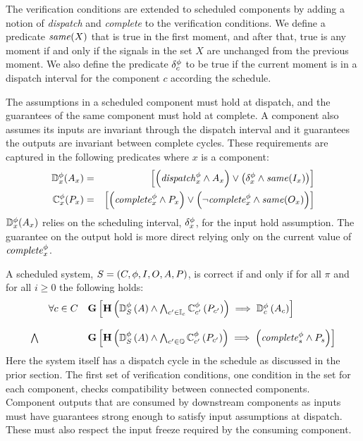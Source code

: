 The verification conditions are extended to scheduled components by adding a notion of \textit{dispatch} and \textit{complete} to the verification conditions.
We define a predicate $\mathit{same}(X)$ that is true in the first moment, and after that, true is any moment if and only if the signals in the set $X$ are unchanged from the previous moment.
We also define the predicate $\delta^\phi_c$ to be true if the current moment is in a dispatch interval for the component $c$ according the schedule.

The assumptions in a scheduled component must hold at dispatch, and the guarantees of the same component must hold at complete.
A component also assumes its inputs are invariant through the dispatch interval and it guarantees the outputs are invariant between complete cycles.
These requirements are captured in the following predicates where $x$ is a component:
\begin{eqnarray*}
  \mathbb{D}^\phi_x(A_x) &=& \left[\left(\mathit{dispatch}^{\phi}_x \wedge A_x\right) \vee \left(\delta^\phi_x \wedge \mathit{same}(I_x)\right)\right] \\
  \mathbb{C}^\phi_x(P_x) &=& \left[\left(\mathit{complete}^{\phi}_x \wedge P_x\right) \vee \left(\neg\mathit{complete}^{\phi}_x \wedge \mathit{same}(O_x)\right)\right] \\
\end{eqnarray*}
$\mathbb{D}^\phi_x(A_x)$ relies on the scheduling interval, $\delta^\phi_x$, for the input hold assumption.
The guarantee on the output hold is more direct relying only on the current value of $\mathit{complete}^{\phi}_x$.

A scheduled system, $S = (C, \phi, I, O, A, P)$, is correct if and only if for all $\pi$ and for all $i \ge 0$ the following holds:
\[
\begin{array}{lll}
        & \forall c \in C &  
            \mathbf{G}\left[\mathbf{H}\left(\mathbb{D}^\phi_S\left(A\right) \wedge 
            \bigwedge_{c^\prime \in \mathbb{I}_c} \mathbb{C}^\phi_{c^\prime}\left(P_{c^\prime}\right)\right) 
            \implies \mathbb{D}^\phi_c\left(A_c\right)\right] \\ \\
 \bigwedge &   & 
            \mathbf{G}\left[\mathbf{H}\left(\mathbb{D}^\phi_S\left(A\right) \wedge 
            \bigwedge_{c^\prime \in \mathbb{O}} \mathbb{C}^\phi_{c^\prime}\left(P_{c^\prime}\right)\right)
            \implies \left(\mathit{complete}^{\phi}_s \wedge P_s\right)\right]
\end{array}
\]
Here the system itself has a dispatch cycle in the schedule as discussed in the prior section.
The first set of verification conditions, one condition in the set for each component, checks compatibility between connected components.
Component outputs that are consumed by downstream components as inputs must have guarantees strong enough to satisfy input assumptions at dispatch.
These must also respect the input freeze required by the consuming component.

